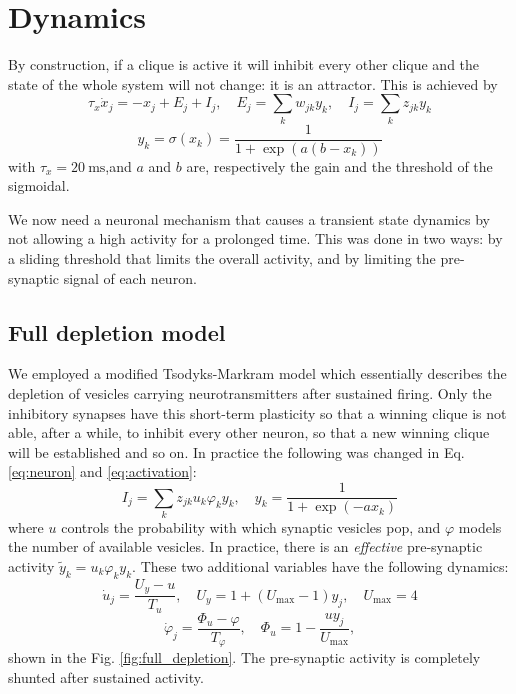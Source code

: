 \documentclass[12pt,a4paper]{article}
\begin{document}
	\section{Dynamics}
		By construction, if a clique is active it will inhibit every other clique and the state of the whole system will not change: it is an attractor. This is achieved by
		\begin{equation}
			\tau_x \dot{x}_j = -x_j + E_j + I_j, \quad E_j = \sum_{k} w_{jk} y_k, \quad I_j = \sum_k z_{jk} y_k
			\label{eq:neuron}
		\end{equation}
		\begin{equation}
			y_k = \sigma \left(x_k\right) = \frac{1}{1+\exp \left(a  \left(b - x_k \right)\right) }
			\label{eq:activation}
		\end{equation}
		with $\tau_x = 20 \ \text{ms}$,and $a$ and $b$ are, respectively the gain and the threshold of the sigmoidal.
		
		We now need a neuronal mechanism that causes a transient state dynamics by not allowing a high activity for a prolonged time. This was done in two ways: by a sliding threshold that limits the overall activity, and by limiting the pre-synaptic signal of each neuron.
		
		\subsection{Full depletion model}
		We employed a modified Tsodyks-Markram model which essentially describes the depletion of vesicles carrying neurotransmitters after sustained firing. Only the inhibitory synapses have this short-term plasticity so that a winning clique is not able, after a while, to inhibit every other neuron, so that a new winning clique will be established and so on. In practice the following was changed in Eq. \ref{eq:neuron} and \ref{eq:activation}:
		\begin{equation}
			I_j = \sum_k z_{jk} u_k \varphi_k y_k, \quad y_k = \frac{1}{1+\exp \left(- a x_k \right)}
		\end{equation}
		where $u$ controls the probability with which synaptic vesicles pop, and $\varphi$ models the number of available vesicles. In practice, there is an \emph{effective} pre-synaptic activity $\tilde{y}_k = u_k \varphi_k y_k$. These two additional variables have the following dynamics:
		\begin{equation}
			\dot{u}_j = \frac{U_y -u}{T_u}, \quad U_y = 1 + \left( U_\text{max} -1 \right) y_j, \quad U_\text{max} = 4
		\end{equation}
		\begin{equation}
		\dot{\varphi}_j = \frac{\varPhi_u - \varphi}{T_\varphi}, \quad \varPhi_u = 1- \frac{u y_j}{U_\text{max}},
		\end{equation}
		shown in the Fig. \ref{fig:full_depletion}. The pre-synaptic activity is completely shunted after sustained activity.
		
\end{document}
